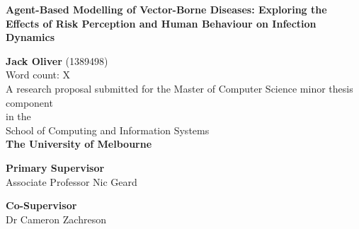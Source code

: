 \documentclass[a4paper, titlepage, 12pt]{article}
\newcommand{\thesisTitle}{Agent-Based Modelling of Vector-Borne Diseases: Exploring the Effects of Risk Perception and Human Behaviour on Infection Dynamics}
\newcommand{\name}{Jack Oliver}
\newcommand{\timeFrame}{School of Computing and Information Systems}
\newcommand{\school}{The University of Melbourne}
\newcommand{\supervisor}{Associate Professor Nic Geard}
\newcommand{\advisor}{Dr Cameron Zachreson}
\begin{document}
\begin{singlespace} %
\begin{titlepage}
\begin{center}


\vspace*{1.5cm}

\Large{\textbf{\thesisTitle}}

\vspace{2.5cm}

\large{\textbf{\name} (1389498) \\ Word count: X} \\
\vspace{2cm}
\large{A research proposal submitted for the Master of Computer Science minor thesis component \\}
\vspace{.5cm}
\large{in the} \\
\large{\timeFrame} \\ 
\large{\textbf{\school}}

\vspace{2cm}

\large{\textbf{Primary Supervisor}}\\
\supervisor\\
\vspace{1.5cm}

\textbf{Co-Supervisor}\\
\advisor\\
\end{center}
\end{titlepage}
\end{singlespace}

\tableofcontents
\clearpage



% 
% 
% 

\clearpage
\end{document}
